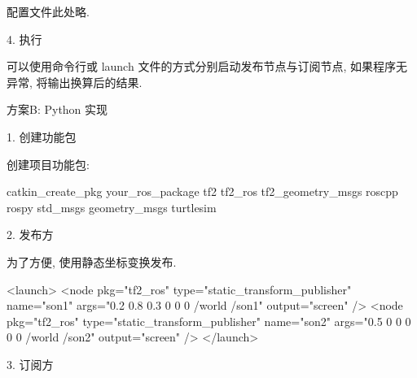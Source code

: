 \documentclass[openany, fontset=windowsold]{ctexbook}
\theoremstyle{kaiti}
\theoremstyle{normal}
\begin{document}
配置文件此处略.

4. 执行

可以使用命令行或 launch 文件的方式分别启动发布节点与订阅节点, 如果程序无异常, 将输出换算后的结果.

方案B: Python 实现

1. 创建功能包

创建项目功能包:

\begin{bash}
  catkin_create_pkg your_ros_package tf2 tf2_ros tf2_geometry_msgs roscpp rospy std_msgs geometry_msgs turtlesim
\end{bash}

2. 发布方

为了方便, 使用静态坐标变换发布.

\begin{xml}
  <launch>
      <node pkg="tf2_ros" type="static_transform_publisher" name="son1" args="0.2 0.8 0.3 0 0 0 /world /son1" output="screen" />
      <node pkg="tf2_ros" type="static_transform_publisher" name="son2" args="0.5 0 0 0 0 0 /world /son2" output="screen" />
  </launch>
\end{xml}

3. 订阅方
\end{document}
